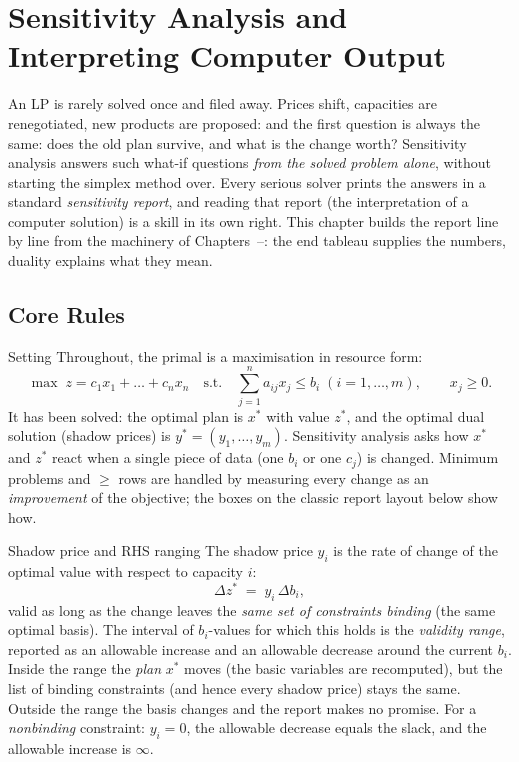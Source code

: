 \chapter{Sensitivity Analysis and Interpreting Computer Output}

An LP is rarely solved once and filed away. Prices shift, capacities are
renegotiated, new products are proposed: and the first question is always
the same: does the old plan survive, and what is the change worth?
Sensitivity analysis answers such what-if
questions \emph{from the solved problem alone}, without starting the simplex
method over. Every serious solver prints the answers in a standard
\emph{sensitivity report}, and reading that
report (the interpretation of a computer solution) is a skill in its
own right. This chapter builds the report line by line from the machinery
of Chapters~--: the end tableau supplies the numbers, duality explains
what they mean.

\section{Core Rules}

\begin{rulebox}{Setting}
Throughout, the primal is a maximisation in resource form:
\[
  \max\; z=c_{1}x_{1}+\dots+c_{n}x_{n}
  \quad\text{s.t.}\quad
  \sum_{j=1}^{n}a_{ij}x_{j}\le b_{i}\;(i=1,\dots,m),\qquad x_{j}\ge 0 .
\]
It has been solved: the optimal plan is $x^{*}$ with value $z^{*}$, and the
optimal dual solution (shadow prices) is $y^{*}=(y_{1},\dots,y_{m})$.
Sensitivity analysis asks how $x^{*}$ and $z^{*}$ react when a single piece
of data (one $b_{i}$ or one $c_{j}$) is changed. Minimum problems and
$\ge$ rows are handled by measuring every change as an \emph{improvement}
of the objective; the boxes on the classic report layout below show how.
\end{rulebox}

\begin{rulebox}{Shadow price and RHS ranging}
The shadow price $y_{i}$ is the rate of change of the
optimal value with respect to capacity $i$:
\[
  \Delta z^{*} \;=\; y_{i}\,\Delta b_{i},
\]
valid as long as the change leaves the \emph{same set of constraints
binding} (the same optimal basis). The interval of $b_{i}$-values for which
this holds is the \emph{validity range}, reported as an allowable increase
and an allowable decrease around the current $b_{i}$. Inside the range the
\emph{plan} $x^{*}$ moves (the basic variables are recomputed), but the
list of binding constraints (and hence every shadow price) stays the
same. Outside the range the basis changes and the report makes no promise.
For a \emph{nonbinding} constraint: $y_{i}=0$, the allowable decrease
equals the slack, and the allowable increase is $\infty$.
\end{rulebox}

